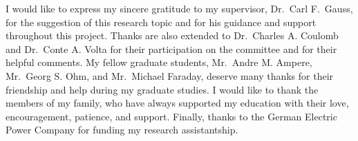 %
\fancyhf{}
\cfoot{\thepage}
%
\SgAddTitle%
\SgAddApproval%
\SgAddStatement%
%
\begin{acknowledgments}
I would like to express my sincere gratitude to my supervisor,
Dr.\ Carl F.\ Gauss, for the suggestion of this research topic and for his
guidance and support throughout this project.
Thanks are also extended to Dr.\ Charles A. Coulomb and Dr.\ Conte A. Volta
for their participation on the committee and for their helpful comments.
My fellow graduate students, Mr.\ Andre M. Ampere, Mr.\ Georg S. Ohm, and
Mr.\ Michael Faraday, deserve many thanks for their friendship and help during
my graduate studies.
I would like to thank the members of my family, who have always supported my
education with their love, encouragement, patience, and support.
Finally, thanks to the German Electric Power Company for funding my research
assistantship.
\end{acknowledgments}
%
\SgAddToc%
\SgAddLof%
\SgAddLot%
\SgAddLoa%
